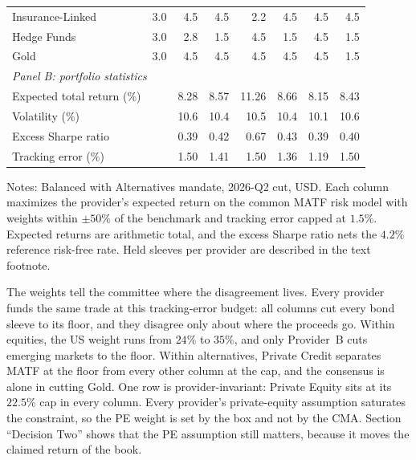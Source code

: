 \documentclass[pdftex,12pt,a4paper]{article}
\begin{document}
\begin{table}[H]
\begin{center}
\begin{tabular}{l rrrrrrr}
			Insurance-Linked          & 3.0  & 4.5  & 4.5  & 2.2  & 4.5  & 4.5  & 4.5 \\
			Hedge Funds               & 3.0  & 2.8  & 1.5  & 4.5  & 1.5  & 4.5  & 1.5 \\
			Gold                      & 3.0  & 4.5  & 4.5  & 4.5  & 4.5  & 4.5  & 1.5 \\
			\midrule
			\multicolumn{8}{l}{\textit{Panel B: portfolio statistics}} \\
			Expected total return (\%) &      & 8.28 & 8.57 & 11.26 & 8.66 & 8.15 & 8.43 \\
			Volatility (\%)            &      & 10.6 & 10.4 & 10.5  & 10.4 & 10.1 & 10.6 \\
			Excess Sharpe ratio        &      & 0.39 & 0.42 & 0.67  & 0.43 & 0.39 & 0.40 \\
			Tracking error (\%)        &      & 1.50 & 1.41 & 1.50  & 1.36 & 1.19 & 1.50 \\
			\bottomrule
		\end{tabular}
	\end{center}
	\vspace*{-0.5\baselineskip}
	{\footnotesize Notes: Balanced with Alternatives mandate, 2026-Q2 cut, USD. Each column maximizes the provider's expected return on the common MATF risk model with weights within $\pm 50\%$ of the benchmark and tracking error capped at $1.5\%$. Expected returns are arithmetic total, and the excess Sharpe ratio nets the $4.2\%$ reference risk-free rate. Held sleeves per provider are described in the text footnote.}
\end{table}

The weights tell the committee where the disagreement lives. Every provider funds the same trade at this tracking-error budget: all columns cut every bond sleeve to its floor, and they disagree only about where the proceeds go. Within equities, the US weight runs from $24\%$ to $35\%$, and only Provider~B cuts emerging markets to the floor. Within alternatives, Private Credit separates MATF at the floor from every other column at the cap, and the consensus is alone in cutting Gold. One row is provider-invariant: Private Equity sits at its $22.5\%$ cap in every column. Every provider's private-equity assumption saturates the constraint, so the PE weight is set by the box and not by the CMA. Section ``Decision Two'' shows that the PE assumption still matters, because it moves the claimed return of the book.
\end{document}
